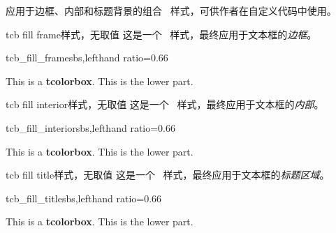 \clearpage

应用于边框、内部和标题背景的组合 \tikzname\ 样式，可供作者在自定义代码中使用。

\begin{docTikzKey}{tcb fill frame}{}{样式，无取值}
这是一个 \tikzname\ 样式，最终应用于文本框的\emph{边框}。

\begin{exdispExample*}{tcb_fill_frame}{sbs,lefthand ratio=0.66}

\begin{tcolorbox}[title=My title]
This is a \textbf{tcolorbox}.
\tcblower
This is the lower part.
\end{tcolorbox}
\end{exdispExample*}
\end{docTikzKey}


\begin{docTikzKey}{tcb fill interior}{}{样式，无取值}
这是一个 \tikzname\ 样式，最终应用于文本框的\emph{内部}。

\begin{exdispExample*}{tcb_fill_interior}{sbs,lefthand ratio=0.66}

\begin{tcolorbox}[title=My title]
This is a \textbf{tcolorbox}.
\tcblower
This is the lower part.
\end{tcolorbox}
\end{exdispExample*}
\end{docTikzKey}


\begin{docTikzKey}{tcb fill title}{}{样式，无取值}
这是一个 \tikzname\ 样式，最终应用于文本框的\emph{标题区域}。

\begin{exdispExample*}{tcb_fill_title}{sbs,lefthand ratio=0.66}

\begin{tcolorbox}[title=My title]
This is a \textbf{tcolorbox}.
\tcblower
This is the lower part.
\end{tcolorbox}
\end{exdispExample*}
\end{docTikzKey}

